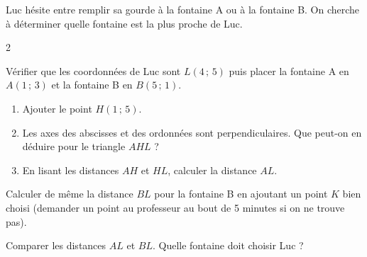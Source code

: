 Luc hésite entre remplir sa gourde à la fontaine A ou à la fontaine B. On cherche à déterminer quelle fontaine est la plus proche de Luc.

	\begin{MADenumerate}
		\begin{multicols}{2}

			\item Vérifier que les coordonnées de Luc sont $L(4\,;\,5)$ puis placer la fontaine A en $A(1\,;\,3)$ et la fontaine B en $B(5\,;\,1)$.
			\item \begin{enumerate}

				\item Ajouter le point $H(1\,;\,5)$.
				\item Les axes des abscisses et des ordonnées sont perpendiculaires. Que peut-on en déduire pour le triangle $AHL$ ?
				\item En lisant les distances $AH$ et $HL$, calculer la distance $AL$.
			\end{enumerate}
			\item Calculer de même la distance $BL$ pour la fontaine B en ajoutant un point $K$ bien choisi (demander un point au professeur au bout de 5 minutes si on ne trouve pas).
			\item Comparer les distances $AL$ et $BL$. Quelle fontaine doit choisir Luc ?

			\columnbreak


		\end{multicols}

	\end{MADenumerate}
